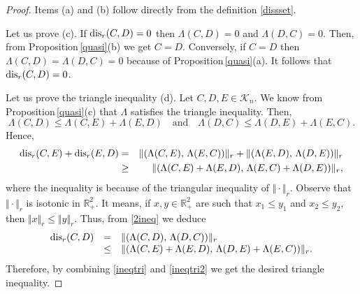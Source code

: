 \documentclass[hidelinks,onefignum,onetabnum]{siamart250211}
\theoremstyle{definition}
\theoremstyle{remark}
\newcommand{\R}{\mathbb R}
\newcommand{\dis}{{\rm dis}}
\begin{document}
\begin{proof}
Items (a) and (b) follow directly from the definition \eqref{dissset}. 

Let us prove (c). If $\dis_r(C,D)=0$ then $\Lambda(C,D)=0$ and $\Lambda(D,C)=0$. Then, from Proposition\,\ref{quasi}(b) we get $C=D$. Conversely, if $C=D$ then $\Lambda(C,D)=\Lambda(D,C)=0$ because of Proposition\,\ref{quasi}(a). It follows that $\dis_r(C,D)=0$.

Let us prove the triangle inequality (d). Let $C,D,E\in\mathcal K_n$. We know from Proposition\,\ref{quasi}(c) that $\Lambda$ satisfies the triangle inequality. Then,
\begin{equation}\label{2ineq}
\Lambda(C,D)\leq \Lambda(C,E)+\Lambda(E,D)\quad\text{and}\quad \Lambda(D,C)\leq \Lambda(D,E)+\Lambda(E,C).
\end{equation}
Hence,
\begin{eqnarray}
\dis_r(C,E)+\dis_r(E,D)&=&\Vert(\Lambda(C,E),\,\Lambda(E,C))\Vert_r + \Vert(\Lambda(E,D),\,\Lambda(D,E))\Vert_r\nonumber\\
&\geq& \Vert(\Lambda(C,E)+\Lambda(E,D),\,\Lambda(E,C)+\Lambda(D,E))\Vert_r,\label{ineqtri}
\end{eqnarray}
where the inequality is because of the triangular inequality of $\Vert\cdot\Vert_r$. Observe that $\Vert\cdot\Vert_r$ is isotonic in $\R^2_+$. It means, if $x,y\in\R^2_+$ are such that $x_1\leq y_1$ and $x_2\leq y_2$, then $\Vert x\Vert_r\leq\Vert y\Vert_r$. Thus, from \eqref{2ineq} we deduce
\begin{equation}\label{ineqtri2}
\begin{array}{rcl}
\dis_r(C,D)&=&\Vert(\Lambda(C,D),\,\Lambda(D,C))\Vert_r\\&\leq&\Vert (\Lambda(C,E)+\Lambda(E,D),\,\Lambda(D,E)+\Lambda(E,C))\Vert_r.
\end{array}
\end{equation}
Therefore, by combining \eqref{ineqtri} and \eqref{ineqtri2} we get the desired triangle inequality.
\end{proof}
\end{document}
